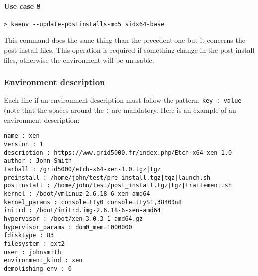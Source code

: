 \documentclass[a4wide,10pt,oneside]{book}
\begin{document}
\paragraph{Use case 8}
\begin{verbatim}
> kaenv --update-postinstalls-md5 sidx64-base
\end{verbatim}
This command does the same thing than the precedent one but it concerns the post-install files. This operation is required if something change in the post-install files, otherwise the environment will be unusable.

\subsubsection{Environment description}\label{sec:env_desc}
Each line if an environment description must follow the pattern: \texttt{key : value} (note that the spaces around the \texttt{:} are mandatory.
Here is an example of an environment description:
\begin{small}
\begin{verbatim}
name : xen
version : 1
description : https://www.grid5000.fr/index.php/Etch-x64-xen-1.0
author : John Smith
tarball : /grid5000/etch-x64-xen-1.0.tgz|tgz
preinstall : /home/john/test/pre_install.tgz|tgz|launch.sh
postinstall : /home/john/test/post_install.tgz|tgz|traitement.sh
kernel : /boot/vmlinuz-2.6.18-6-xen-amd64
kernel_params : console=tty0 console=ttyS1,38400n8
initrd : /boot/initrd.img-2.6.18-6-xen-amd64
hypervisor : /boot/xen-3.0.3-1-amd64.gz
hypervisor_params : dom0_mem=1000000
fdisktype : 83
filesystem : ext2
user : johnsmith
environment_kind : xen
demolishing_env : 0
\end{verbatim}
\end{small}
\end{document}
